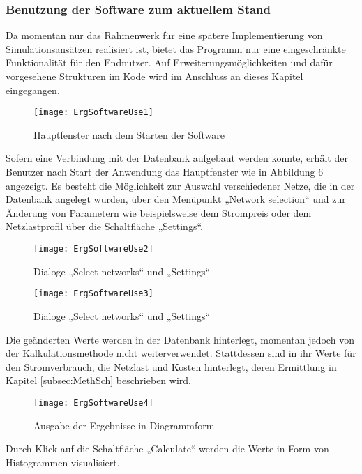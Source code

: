 \subsubsection{Benutzung der Software zum aktuellem Stand}
Da momentan nur das Rahmenwerk für eine spätere Implementierung von Simulationsansätzen realisiert ist, bietet das Programm nur eine eingeschränkte Funktionalität für den Endnutzer. Auf Erweiterungsmöglichkeiten und dafür vorgesehene Strukturen im Kode wird im Anschluss an dieses Kapitel eingegangen.
\begin{figure}[ht]
	\centering
	\texttt{[image: ErgSoftwareUse1]}
	\caption{Hauptfenster nach dem Starten der Software}
	\label{fig:ErgSoftwareUse1}
\end{figure}
Sofern eine Verbindung mit der Datenbank aufgebaut werden konnte, erhält der Benutzer nach Start der Anwendung das Hauptfenster wie in Abbildung 6 angezeigt. Es besteht die Möglichkeit zur Auswahl verschiedener Netze, die in der Datenbank angelegt wurden, über den Menüpunkt „Network selection“ und zur Änderung von Parametern wie beispielsweise dem Strompreis oder dem Netzlastprofil über die Schaltfläche „Settings“.
\begin{figure}[ht]
	\centering
	\texttt{[image: ErgSoftwareUse2]}
	\caption{Dialoge „Select networks“ und „Settings“}
	\label{fig:ErgSoftwareUse2}
\end{figure}
\begin{figure}[ht]
	\centering
	\texttt{[image: ErgSoftwareUse3]}
	\caption{Dialoge „Select networks“ und „Settings“}
	\label{fig:ErgSoftwareUse3}
\end{figure}
Die geänderten Werte werden in der Datenbank hinterlegt, momentan jedoch von der Kalkulationsmethode nicht weiterverwendet. Stattdessen sind in ihr Werte für den Stromverbrauch, die Netzlast und Kosten hinterlegt, deren Ermittlung in Kapitel \ref{subsec:MethSch} beschrieben wird.
\begin{figure}[ht]
	\centering
	\texttt{[image: ErgSoftwareUse4]}
	\caption{Ausgabe der Ergebnisse in Diagrammform}
	\label{fig:ErgSoftwareUse4}
\end{figure}
Durch Klick auf die Schaltfläche „Calculate“ werden die Werte in Form von Histogrammen visualisiert.


